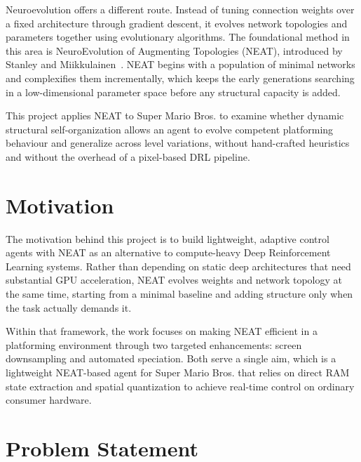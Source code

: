 \noindent
Neuroevolution offers a different route. Instead of tuning connection weights
over a fixed architecture through gradient descent, it evolves network
topologies and parameters together using evolutionary algorithms. The
foundational method in this area is NeuroEvolution of Augmenting Topologies
(NEAT), introduced by Stanley and Miikkulainen~\cite{stanley2002}. NEAT begins with a
population of minimal networks and complexifies them incrementally, which keeps
the early generations searching in a low-dimensional parameter space before any
structural capacity is added.

\noindent
This project applies NEAT to Super Mario Bros. to examine whether dynamic
structural self-organization allows an agent to evolve competent platforming
behaviour and generalize across level variations, without hand-crafted
heuristics and without the overhead of a pixel-based DRL pipeline.

\section{Motivation}
\label{sec:motivation}

The motivation behind this project is to build lightweight, adaptive control
agents with NEAT as an alternative to compute-heavy Deep Reinforcement Learning
systems. Rather than depending on static deep architectures that need
substantial GPU acceleration, NEAT evolves weights and network topology at the
same time, starting from a minimal baseline and adding structure only when the
task actually demands it.

\noindent
Within that framework, the work focuses on making NEAT efficient in a
platforming environment through two targeted enhancements: screen downsampling
and automated speciation. Both serve a single aim, which is a lightweight
NEAT-based agent for Super Mario Bros. that relies on direct RAM state
extraction and spatial quantization to achieve real-time control on ordinary
consumer hardware.

\section{Problem Statement}
\label{sec:problem-statement}

